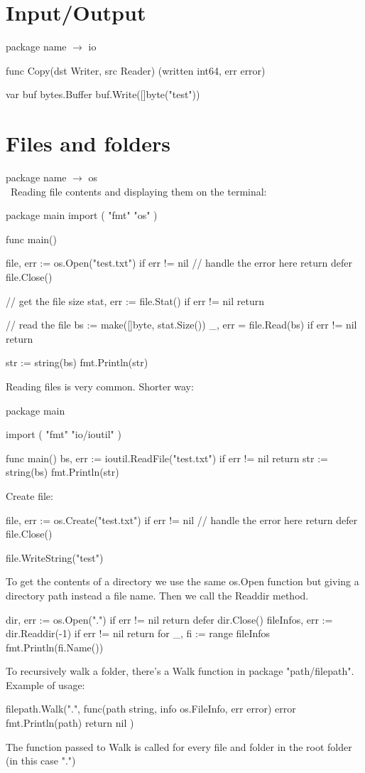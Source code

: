 \documentclass[twoside,a4paper,english]{report}
\begin{document}
\section{Input/Output}
package name $\rightarrow$ io
\begin{go}
func Copy(dst Writer, src Reader) (written
int64, err error)

var buf bytes.Buffer
buf.Write([]byte("test"))   
\end{go}
\section{Files and folders}
package name $\rightarrow$ os\\\
Reading file contents and displaying them on the terminal:
\begin{go}
package main
import (
    "fmt"
    "os"
)

func main() {
    file, err := os.Open("test.txt")
    if err != nil {
        // handle the error here
        return 
    }
    defer file.Close()

    // get the file size
    stat, err := file.Stat()
    if err != nil {
        return 
    }

    // read the file
    bs := make([]byte, stat.Size())
    _, err = file.Read(bs)
    if err != nil {
        return 
    }

    str := string(bs)
    fmt.Println(str)
}
\end{go}
\vspace{0.7cm}
Reading files is very common. Shorter way:
\begin{go}
package main

import (
     "fmt"
     "io/ioutil"
)

func main() {
    bs, err := ioutil.ReadFile("test.txt")
    if err != nil {
        return 
    }
    str := string(bs)
    fmt.Println(str)
}   
\end{go}
\vspace{0.7cm}
Create file:
\begin{go}
file, err := os.Create("test.txt")
if err != nil {
    // handle the error here
    return 
}
defer file.Close()

file.WriteString("test")  
\end{go} 
\vspace{0.7cm} 
To get the contents of a directory we use the same os.Open function but giving a directory path instead a file name. Then we call the Readdir method.
\begin{go}
dir, err := os.Open(".")
if err != nil {
    return 
}
defer dir.Close()
fileInfos, err := dir.Readdir(-1)
if err != nil {
    return 
}
for _, fi := range fileInfos {
       fmt.Println(fi.Name())
}
\end{go}
\vspace{0.7cm}
To recursively walk a folder, there's a Walk function in package "path/filepath". Example of usage:
\begin{go}
filepath.Walk(".", func(path string, info os.FileInfo, err error) error {
    fmt.Println(path)
    return nil 
})
\end{go}
\vspace{0.7cm}
The function passed to Walk is called for every file and folder in the root folder (in this case ".")   
\end{document}
